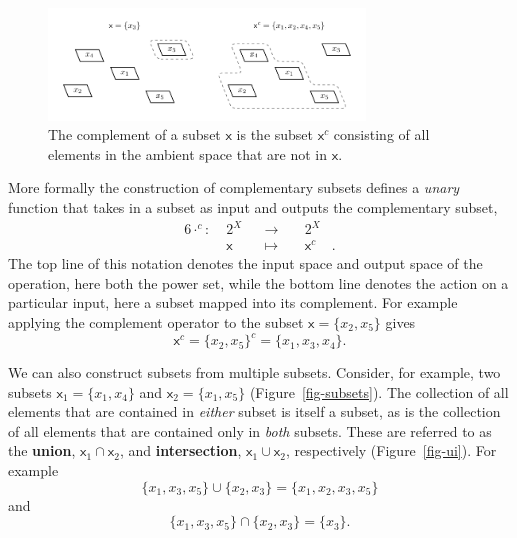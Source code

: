 \documentclass[
  letterpaper,
  DIV=11,
  numbers=noendperiod]{scrartcl}
\begin{document}
\begin{figure}

{\centering \includegraphics[width=0.75\textwidth,height=\textheight]{figures/complement/complement.pdf}

}

\caption{\label{fig-complement}The complement of a subset \(\mathsf{x}\)
is the subset \(\mathsf{x}^{c}\) consisting of all elements in the
ambient space that are not in \(\mathsf{x}\).}

\end{figure}

More formally the construction of complementary subsets defines a
\emph{unary} function that takes in a subset as input and outputs the
complementary subset, \begin{alignat*}{6}
\cdot^c :\; & 2^X & &\rightarrow& \; & 2^X &
\\
& \mathsf{x} & &\mapsto& & \mathsf{x}^{c} &.
\end{alignat*} The top line of this notation denotes the input space and
output space of the operation, here both the power set, while the bottom
line denotes the action on a particular input, here a subset mapped into
its complement. For example applying the complement operator to the
subset \(\mathsf{x} = \{ x_{2}, x_{5} \}\) gives \[
\mathsf{x}^{c} = \{ x_{2}, x_{5} \}^{c} = \{ x_{1}, x_{3}, x_{4} \}.
\]

We can also construct subsets from multiple subsets. Consider, for
example, two subsets \(\mathsf{x}_1 = \{ x_{1}, x_{4} \}\) and
\(\mathsf{x}_2 = \{ x_{1}, x_{5} \}\) (Figure~\ref{fig-subsets}). The
collection of all elements that are contained in \emph{either} subset is
itself a subset, as is the collection of all elements that are contained
only in \emph{both} subsets. These are referred to as the
\textbf{union}, \(\mathsf{x}_1 \cap \mathsf{x}_2\), and
\textbf{intersection}, \(\mathsf{x}_1 \cup \mathsf{x}_2\), respectively
(Figure~\ref{fig-ui}). For example \[
\{ x_1, x_3, x_5 \} \cup \{ x_2, x_3 \} = \{ x_1, x_2, x_3, x_5 \}
\] and \[
\{ x_1, x_3, x_5 \} \cap \{ x_2, x_3 \} = \{ x_3 \}.
\]
\end{document}
